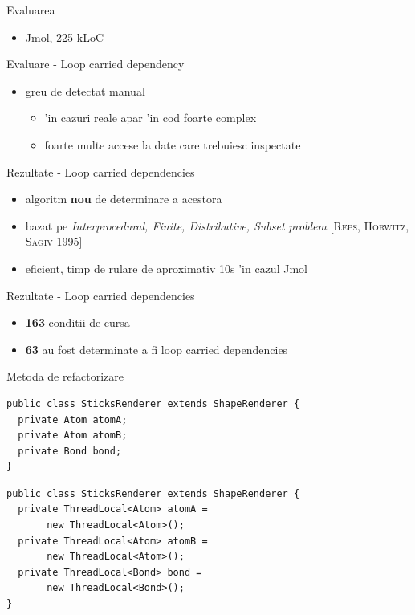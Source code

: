 \documentclass{beamer}
\begin{document}
\begin{frame}{Evaluarea}
\Huge
\begin{itemize}
  \item Jmol, 225 kLoC
\end{itemize}
\end{frame}

\begin{frame}{Evaluare - Loop carried dependency}
\Huge
\begin{itemize}
  \item greu de detectat manual 
  \begin{itemize}
    \item \pause 'in cazuri reale apar 'in cod foarte complex
    \item \pause foarte multe accese la date care trebuiesc inspectate
  \end{itemize} 
\end{itemize}
\end{frame}


\begin{frame}{Rezultate - Loop carried dependencies}
\Large
\begin{itemize}
  \item algoritm \textbf{nou} de determinare a acestora
  \item \pause bazat pe \textit{Interprocedural, Finite,
  Distributive, Subset problem} \textsc{[Reps, Horwitz, Sagiv 1995]}
  \item \pause eficient, timp de rulare de aproximativ 10s 'in cazul Jmol
\end{itemize}
\end{frame}

\begin{frame}{Rezultate - Loop carried dependencies}
\huge
\begin{itemize}
  \item \textbf{163} conditii de cursa
  \item \pause \textbf{63} au fost determinate a fi loop carried dependencies
\end{itemize}
\end{frame}

\begin{frame}[fragile]{Metoda de refactorizare}
\normalsize
\begin{lstlisting}
public class SticksRenderer extends ShapeRenderer {
  private Atom atomA;
  private Atom atomB;
  private Bond bond;
}
\end{lstlisting}

\begin{lstlisting}
public class SticksRenderer extends ShapeRenderer {
  private ThreadLocal<Atom> atomA = 
       new ThreadLocal<Atom>(); 
  private ThreadLocal<Atom> atomB = 
       new ThreadLocal<Atom>();
  private ThreadLocal<Bond> bond = 
       new ThreadLocal<Bond>();
}
\end{lstlisting}
\end{frame}
\end{document}
